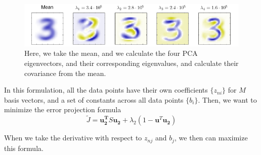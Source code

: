 \documentclass{tufte-handout}
\renewcommand{\vec}[1]{\mathbf{#1}} %
\begin{document}
\begin{center}
	\begin{figure}
		\includegraphics[scale=0.4]{number_class}
		\caption{Here, we take the mean, and we calculate the four PCA eigenvectors, and their 
			corresponding eigenvalues, and calculate their covariance from the mean.}
	\end{figure}
\end{center}

In this formulation, all the data points have their own coefficients $\{z_{ni}\}$ for $M$ basis
vectors, and a set of constants across all data points $\{b_{i}\}$. Then, we want to minimize the
error projection formula
\[ \tilde{J} = \vec{u^{T}_{2}}S\vec{u_{2}} + \lambda_{2}(1 - \vec{u}^{T}\vec{u_{2}})\]

When we take the derivative with respect to $z_{nj}$ and $b_{j}$, we then can maximize this formula.
\end{document}
